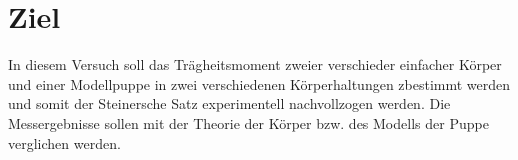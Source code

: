 \section{Ziel}
In diesem Versuch soll das Trägheitsmoment zweier verschieder einfacher Körper
und einer Modellpuppe in zwei verschiedenen Körperhaltungen zbestimmt werden und
somit der Steinersche Satz experimentell nachvollzogen werden.
Die Messergebnisse sollen mit der Theorie der Körper bzw. des Modells der Puppe
verglichen werden.
\label{sec:Ziel}
